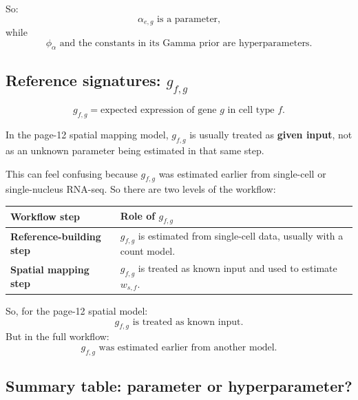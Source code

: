 \documentclass[11pt]{article}
\newcommand{\term}[1]{\textbf{#1}}
\begin{document}
So:
\[
\alpha_{e,g}\text{ is a parameter,}
\]
while
\[
\phi_\alpha\text{ and the constants in its Gamma prior are hyperparameters.}
\]

\subsection{Reference signatures: $g_{f,g}$}

\[
g_{f,g}=\text{expected expression of gene }g\text{ in cell type }f.
\]

In the page-12 spatial mapping model, $g_{f,g}$ is usually treated as \term{given input}, not as an unknown parameter being estimated in that same step.

This can feel confusing because $g_{f,g}$ was estimated earlier from single-cell or single-nucleus RNA-seq. So there are two levels of the workflow:

\begin{center}
\begin{tabularx}{0.95\textwidth}{>{\bfseries}p{}X}
\toprule
Workflow step & Role of $g_{f,g}$ \\
\midrule
Reference-building step & $g_{f,g}$ is estimated from single-cell data, usually with a count model. \\
Spatial mapping step & $g_{f,g}$ is treated as known input and used to estimate $w_{s,f}$. \\
\bottomrule
\end{tabularx}
\end{center}

So, for the page-12 spatial model:
\[
g_{f,g}\text{ is treated as known input.}
\]
But in the full workflow:
\[
g_{f,g}\text{ was estimated earlier from another model.}
\]

\subsection{Summary table: parameter or hyperparameter?}
\end{document}

